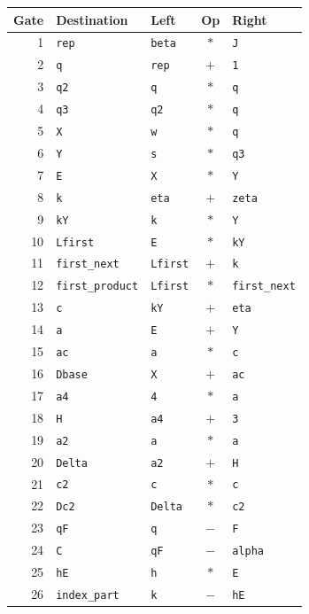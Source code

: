 \begingroup\scriptsize
\setlength{\tabcolsep}{2.5pt}
\begin{longtable}{rllcl}
\toprule Gate & Destination & Left & Op & Right\\\midrule\endhead
1 & \texttt{rep} & \texttt{beta} & $*$ & \texttt{J}\\
2 & \texttt{q} & \texttt{rep} & $+$ & \texttt{1}\\
3 & \texttt{q2} & \texttt{q} & $*$ & \texttt{q}\\
4 & \texttt{q3} & \texttt{q2} & $*$ & \texttt{q}\\
5 & \texttt{X} & \texttt{w} & $*$ & \texttt{q}\\
6 & \texttt{Y} & \texttt{s} & $*$ & \texttt{q3}\\
7 & \texttt{E} & \texttt{X} & $*$ & \texttt{Y}\\
8 & \texttt{k} & \texttt{eta} & $+$ & \texttt{zeta}\\
9 & \texttt{kY} & \texttt{k} & $*$ & \texttt{Y}\\
10 & \texttt{Lfirst} & \texttt{E} & $*$ & \texttt{kY}\\
11 & \texttt{first\_next} & \texttt{Lfirst} & $+$ & \texttt{k}\\
12 & \texttt{first\_product} & \texttt{Lfirst} & $*$ & \texttt{first\_next}\\
13 & \texttt{c} & \texttt{kY} & $+$ & \texttt{eta}\\
14 & \texttt{a} & \texttt{E} & $+$ & \texttt{Y}\\
15 & \texttt{ac} & \texttt{a} & $*$ & \texttt{c}\\
16 & \texttt{Dbase} & \texttt{X} & $+$ & \texttt{ac}\\
17 & \texttt{a4} & \texttt{4} & $*$ & \texttt{a}\\
18 & \texttt{H} & \texttt{a4} & $+$ & \texttt{3}\\
19 & \texttt{a2} & \texttt{a} & $*$ & \texttt{a}\\
20 & \texttt{Delta} & \texttt{a2} & $+$ & \texttt{H}\\
21 & \texttt{c2} & \texttt{c} & $*$ & \texttt{c}\\
22 & \texttt{Dc2} & \texttt{Delta} & $*$ & \texttt{c2}\\
23 & \texttt{qF} & \texttt{q} & $-$ & \texttt{F}\\
24 & \texttt{C} & \texttt{qF} & $-$ & \texttt{alpha}\\
25 & \texttt{hE} & \texttt{h} & $*$ & \texttt{E}\\
26 & \texttt{index\_part} & \texttt{k} & $-$ & \texttt{hE}\\

\end{longtable}
